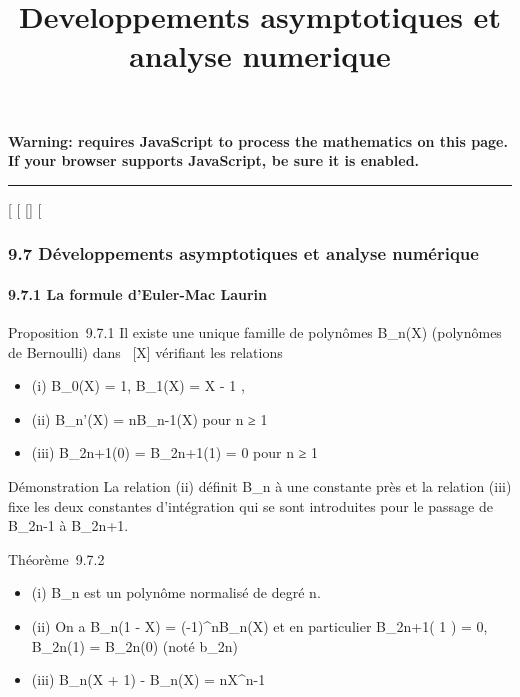 \documentclass[]{article}
\title{Developpements asymptotiques et analyse numerique}
\author{}
\date{}
\begin{document}
\maketitle

\textbf{Warning: 
requires JavaScript to process the mathematics on this page.\\ If your
browser supports JavaScript, be sure it is enabled.}

\begin{center}\rule{3in}{0.4pt}\end{center}

[
[
[]
[

\subsubsection{9.7 Développements asymptotiques et analyse numérique}

\paragraph{9.7.1 La formule d'Euler-Mac Laurin}

Proposition~9.7.1 Il existe une unique famille de polynômes
B_n(X) (polynômes de Bernoulli) dans ~[X] vérifiant les
relations

\begin{itemize}
\itemsep1pt\parskip0pt
\item
  (i) B_0(X) = 1, B_1(X) = X - 1
   ,
\item
  (ii) B_n'(X) = nB_n-1(X) pour n ≥ 1
\item
  (iii) B_2n+1(0) = B_2n+1(1) = 0 pour n ≥ 1
\end{itemize}

Démonstration La relation (ii) définit B_n à une constante près
et la relation (iii) fixe les deux constantes d'intégration qui se sont
introduites pour le passage de B_2n-1 à B_2n+1.

Théorème~9.7.2

\begin{itemize}
\itemsep1pt\parskip0pt
\item
  (i) B_n est un polynôme normalisé de degré n.
\item
  (ii) On a B_n(1 - X) = (-1)^nB_n(X) et en
  particulier B_2n+1( 1  ) = 0,
  B_2n(1) = B_2n(0) (noté b_2n)
\item
  (iii) B_n(X + 1) - B_n(X) = nX^n-1
\end{itemize}
\end{document}
